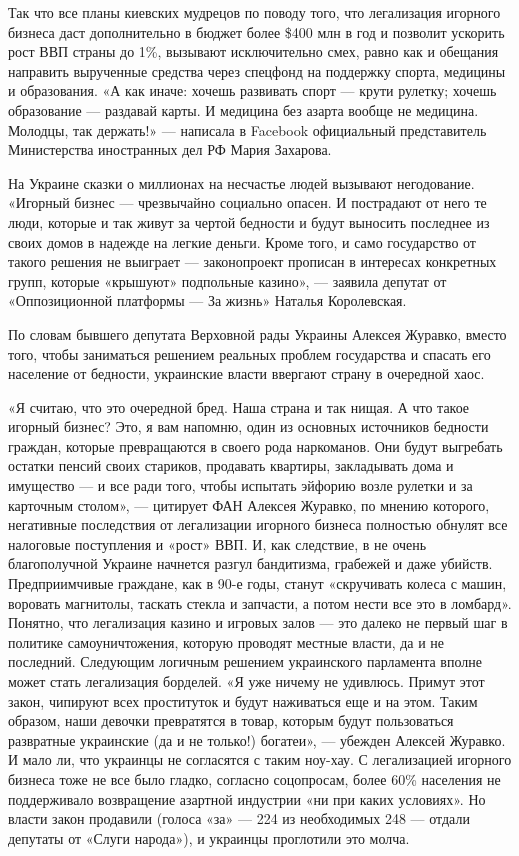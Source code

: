 \documentclass[a4paper,11pt]{extreport}
\begin{document}
Так что все планы киевских мудрецов по поводу того, что легализация игорного
бизнеса даст дополнительно в бюджет более \$400 млн в год и позволит ускорить
рост ВВП страны до 1\%, вызывают исключительно смех, равно как и обещания
направить вырученные средства через спецфонд на поддержку спорта, медицины и
образования. «А как иначе: хочешь развивать спорт --- крути рулетку; хочешь
образование --- раздавай карты. И медицина без азарта вообще не медицина.
Молодцы, так держать!» --- написала в Facebook официальный представитель
Министерства иностранных дел РФ Мария Захарова.

На Украине сказки о миллионах на несчастье людей вызывают негодование. «Игорный
бизнес --- чрезвычайно социально опасен. И пострадают от него те люди, которые и
так живут за чертой бедности и будут выносить последнее из своих домов в
надежде на легкие деньги. Кроме того, и само государство от такого решения не
выиграет --- законопроект прописан в интересах конкретных групп, которые
«крышуют» подпольные казино», --- заявила депутат от «Оппозиционной платформы —
За жизнь» Наталья Королевская.

По словам бывшего депутата Верховной рады Украины Алексея Журавко, вместо того,
чтобы заниматься решением реальных проблем государства и спасать его население
от бедности, украинские власти ввергают страну в очередной хаос.

«Я считаю, что это очередной бред. Наша страна и так нищая. А что такое игорный
бизнес? Это, я вам напомню, один из основных источников бедности граждан,
которые превращаются в своего рода наркоманов. Они будут выгребать остатки
пенсий своих стариков, продавать квартиры, закладывать дома и имущество --- и все
ради того, чтобы испытать эйфорию возле рулетки и за карточным столом», —
цитирует ФАН Алексея Журавко, по мнению которого, негативные последствия от
легализации игорного бизнеса полностью обнулят все налоговые поступления и
«рост» ВВП. И, как следствие, в не очень благополучной Украине начнется разгул
бандитизма, грабежей и даже убийств. Предприимчивые граждане, как в 90-е годы,
станут «скручивать колеса с машин, воровать магнитолы, таскать стекла и
запчасти, а потом нести все это в ломбард».  Понятно, что легализация казино и
игровых залов --- это далеко не первый шаг в политике самоуничтожения, которую
проводят местные власти, да и не последний. Следующим логичным решением
украинского парламента вполне может стать легализация борделей. «Я уже ничему
не удивлюсь. Примут этот закон, чипируют всех проституток и будут наживаться
еще и на этом. Таким образом, наши девочки превратятся в товар, которым будут
пользоваться развратные украинские (да и не только!) богатеи», --- убежден
Алексей Журавко.  И мало ли, что украинцы не согласятся с таким ноу-хау. С
легализацией игорного бизнеса тоже не все было гладко, согласно соцопросам,
более 60\% населения не поддерживало возвращение азартной индустрии «ни при
каких условиях». Но власти закон продавили (голоса «за» --- 224 из необходимых
248 --- отдали депутаты от «Слуги народа»), и украинцы проглотили это молча.
\end{document}

